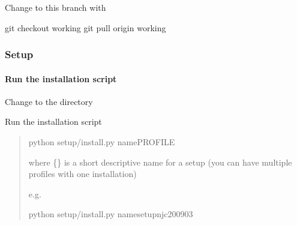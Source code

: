 \documentclass[a4paper,10pt,english]{report}
\begin{document}
\begin{itemize}
\begin{description}
Change to this branch with

\begin{sphinxVerbatim}[commandchars=\\\{\}]
git checkout working
git pull origin working
\end{sphinxVerbatim}

\end{description}

\end{itemize}


\subsubsection{Setup}
\label{\detokenize{user/general/installation:setup}}\label{\detokenize{user/general/installation:installation-setup}}

\paragraph{Run the installation script}
\label{\detokenize{user/general/installation:run-the-installation-script}}
Change to the  directory

Run the installation script
\begin{quote}

\begin{sphinxVerbatim}[commandchars=\\\{\}]
python setup/install.py \PYGZhy{}\PYGZhy{}namePROFILE
\end{sphinxVerbatim}

where \{{\hyperref[\detokenize{misc/glossary:term-profile}]{}}\} is a short descriptive name for a setup (you can have multiple
profiles with one installation)

e.g.

\begin{sphinxVerbatim}[commandchars=\\\{\}]
python setup/install.py \PYGZhy{}\PYGZhy{}namesetup\PYGZus{}njc\PYGZus{}200903
\end{sphinxVerbatim}
\end{quote}
\end{document}
